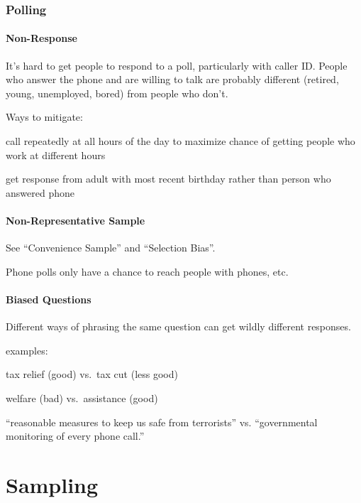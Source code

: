 \documentclass[landscape]{exam}
\begin{document}
  \section{Polling}
  \subsection{Non-Response}
  It's hard to get people to respond to a poll, particularly with caller ID\@.
  People who answer the phone and are willing to talk are probably different
  (retired, young, unemployed, bored) from people who don't.

  Ways to mitigate:
  \begin{itemize*}
    \item call repeatedly at all hours of the day to maximize chance of getting
      people who work at different hours

    \item get response from adult with most recent birthday rather than person
      who answered phone
  \end{itemize*}

  \subsection{Non-Representative Sample}
  See ``Convenience Sample'' and ``Selection Bias''.

  Phone polls only have a chance to reach people with phones, etc.

  \subsection{Biased Questions}
  Different ways of phrasing the same question can get wildly different
  responses.

  examples:
  \begin{itemize*}
    \item tax relief (good) vs.\ tax cut (less good)
    \item welfare (bad) vs.\ assistance (good)
    \item ``reasonable measures to keep us safe from terrorists'' vs.
      ``governmental monitoring of every phone call.''
  \end{itemize*}

  \part{Sampling}
\end{document}
